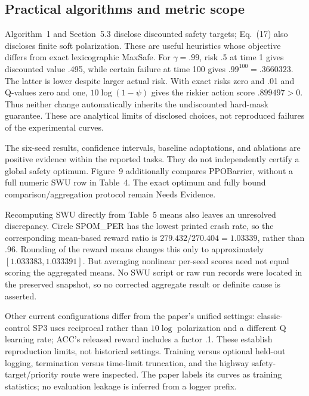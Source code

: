 \documentclass[10pt]{article}
\begin{document}
\subsection*{Practical algorithms and metric scope}
Algorithm 1 and Section 5.3 disclose discounted safety targets; Eq. (17) also discloses finite soft polarization. These are useful heuristics whose objective differs from exact lexicographic MaxSafe. For \(\gamma=.99\), risk .5 at time 1 gives discounted value .495, while certain failure at time 100 gives \(.99^{100}=.3660323\). The latter is lower despite larger actual risk. With exact risks zero and .01 and Q-values zero and one, \(10\log(1-\psi)\) gives the riskier action score \(.899497>0\). Thus neither change automatically inherits the undiscounted hard-mask guarantee. These are analytical limits of disclosed choices, not reproduced failures of the experimental curves.\par
The six-seed results, confidence intervals, baseline adaptations, and ablations are positive evidence within the reported tasks. They do not independently certify a global safety optimum. Figure 9 additionally compares PPOBarrier, without a full numeric SWU row in Table 4. The exact optimum and fully bound comparison/aggregation protocol remain Needs Evidence.\par
Recomputing SWU directly from Table 5 means also leaves an unresolved discrepancy. Circle SPOM\_PER has the lowest printed crash rate, so the corresponding mean-based reward ratio is \(279.432/270.404=1.03339\), rather than .96. Rounding of the reward means changes this only to approximately \([1.033383,1.033391]\). But averaging nonlinear per-seed scores need not equal scoring the aggregated means. No SWU script or raw run records were located in the preserved snapshot, so no corrected aggregate result or definite cause is asserted.\par
Other current configurations differ from the paper’s unified settings: classic-control SP3 uses reciprocal rather than \(10\log\) polarization and a different Q learning rate; ACC’s released reward includes a factor .1. These establish reproduction limits, not historical settings. Training versus optional held-out logging, termination versus time-limit truncation, and the highway safety-target/priority route were inspected. The paper labels its curves as training statistics; no evaluation leakage is inferred from a logger prefix.\par
\end{document}
